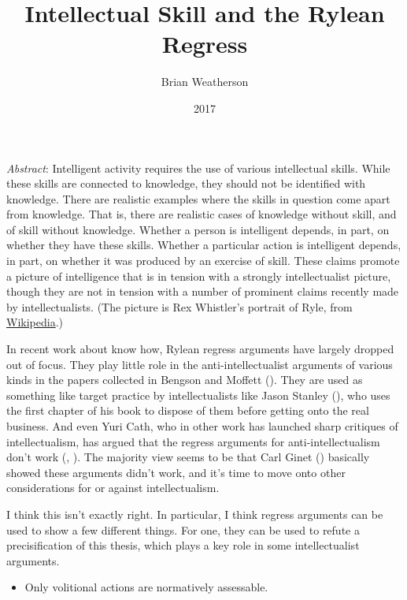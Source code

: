 \documentclass[
  11pt,
  letterpaper,
  DIV=11,
  numbers=noendperiod,
  twoside]{scrartcl}
\title{Intellectual Skill and the Rylean Regress}
\author{Brian Weatherson}
\date{2017}
\providecommand{\tightlist}{%
  \setlength{\itemsep}{0pt}\setlength{\parskip}{0pt}}\usepackage{longtable,booktabs,array}
\renewenvironment{abstract}
 {\vspace{-1.25cm}
 \quotation\small\noindent\emph{Abstract}:}
 {\endquotation}
\begin{document}
\maketitle
\begin{abstract}
Intelligent activity requires the use of various intellectual skills.
While these skills are connected to knowledge, they should not be
identified with knowledge. There are realistic examples where the skills
in question come apart from knowledge. That is, there are realistic
cases of knowledge without skill, and of skill without knowledge.
Whether a person is intelligent depends, in part, on whether they have
these skills. Whether a particular action is intelligent depends, in
part, on whether it was produced by an exercise of skill. These claims
promote a picture of intelligence that is in tension with a strongly
intellectualist picture, though they are not in tension with a number of
prominent claims recently made by intellectualists. (The picture is Rex
Whistler's portrait of Ryle, from
\href{https://en.wikipedia.org/wiki/Gilbert_Ryle\#/media/File:Rex_Whistler_-_Gilbert_Ryle,_Fellow.jpg}{Wikipedia}.)
\end{abstract}


In recent work about know how, Rylean regress arguments have largely
dropped out of focus. They play little role in the anti-intellectualist
arguments of various kinds in the papers collected in Bengson and
Moffett (). They are used as
something like target practice by intellectualists like Jason Stanley
(), who uses the first chapter of his
book to dispose of them before getting onto the real business. And even
Yuri Cath, who in other work has launched sharp critiques of
intellectualism, has argued that the regress arguments for
anti-intellectualism don't work (,
). The majority view seems to be that Carl
Ginet () basically showed these arguments
didn't work, and it's time to move onto other considerations for or
against intellectualism.

I think this isn't exactly right. In particular, I think regress
arguments can be used to show a few different things. For one, they can
be used to refute a precisification of this thesis, which plays a key
role in some intellectualist arguments.

\begin{itemize}
\tightlist
\item
  Only volitional actions are normatively assessable.
\end{itemize}
\end{document}
